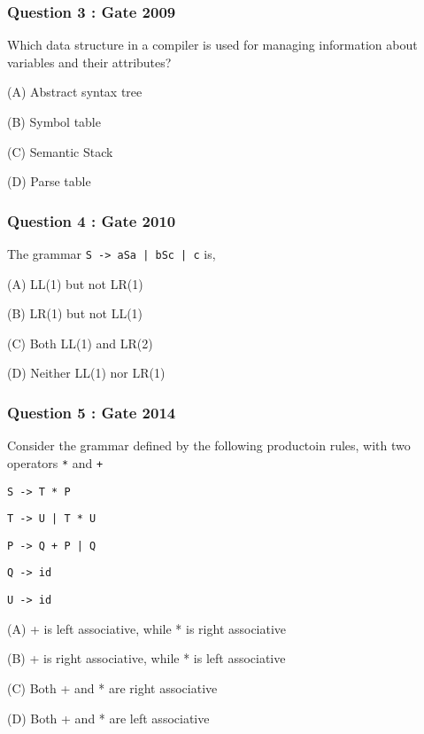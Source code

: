 \begin{frame}
\frametitle{Question 3 : Gate 2009}

\begin{example}
    Which data structure in a compiler is used for managing information about variables and their attributes?

   \vspace{3em}


    (A) Abstract syntax tree

    (B) Symbol table

    (C) Semantic Stack

    (D) Parse table

\end{example}
\end{frame}


\begin{frame}
\frametitle{Question 4 : Gate 2010}

\begin{example}
    The grammar \texttt{S -> aSa | bSc | c} is,

   \vspace{3em}


    (A) LL(1) but not LR(1)

    (B) LR(1) but not LL(1)

    (C) Both LL(1) and LR(2)

    (D) Neither LL(1) nor LR(1)

\end{example}
\end{frame}


\begin{frame}
\frametitle{Question 5 : Gate 2014}

\begin{example}
    Consider the grammar defined by the following productoin rules, with two operators \texttt{*} and \texttt{+}

    \texttt{S -> T * P}

    \texttt{T -> U | T * U}

    \texttt{P -> Q + P | Q}

    \texttt{Q -> id}

    \texttt{U -> id}

   \vspace{3em}

    (A) + is left associative, while * is right associative

    (B) + is right associative, while * is left associative

    (C) Both + and * are right associative

    (D) Both + and * are left associative


\end{example}


\end{frame}

\normalsize
